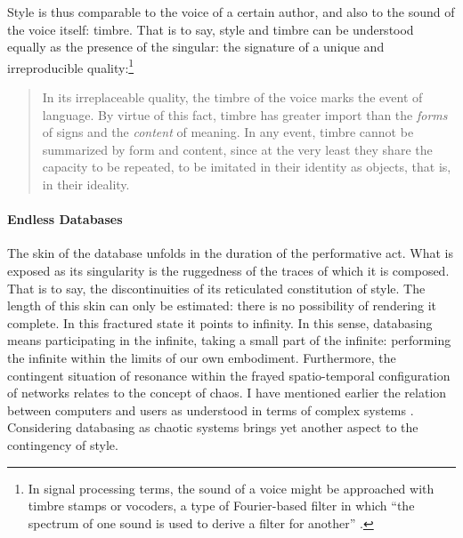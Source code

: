 Style is thus comparable to the voice of a certain author, and also to the sound of the voice itself: timbre. That is to say, style and timbre can be understood equally as the presence of the singular: the signature of a unique and irreproducible quality:\footnote{In signal processing terms, the sound of a voice might be approached with timbre stamps or vocoders, a type of Fourier-based filter in which ``the spectrum of one sound is used to derive a filter for another'' \parencite{DBLP:conf/icmc/Puckette07}.} 

\begin{quote}
	In its irreplaceable quality, the timbre of the voice marks the event of language. By virtue of this fact, timbre has greater import than the \textit{forms} of signs and the \textit{content} of meaning. In any event, timbre cannot be summarized by form and content, since at the very least they share the capacity to be repeated, to be imitated in their identity as objects, that is, in their ideality. \parencite[296]{Der82:Mar}
\end{quote}

\paragraph{Endless Databases}
The skin of the database unfolds in the duration of the performative act. What is exposed as its singularity is the ruggedness of the traces of which it is composed. That is to say, the discontinuities of its reticulated constitution of style. The length of this skin can only be estimated: there is no possibility of rendering it complete. In this fractured state it points to infinity. In this sense, databasing means participating in the infinite, taking a small part of the infinite: performing the infinite within the limits of our own embodiment. Furthermore, the contingent situation of resonance within the frayed spatio-temporal configuration of networks relates to the concept of chaos. I have mentioned earlier the relation between computers and users as understood in terms of complex systems . Considering databasing as chaotic systems brings yet another aspect to the contingency of style. 

